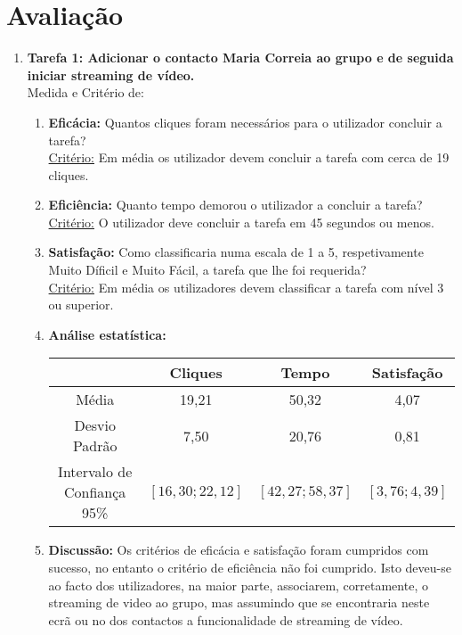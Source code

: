 \documentclass[11pt]{article}
\begin{document}
\section*{Avaliação}
    \begin{enumerate}
        \item \textbf{Tarefa 1: Adicionar o contacto Maria Correia ao grupo e de seguida iniciar streaming de vídeo.}\\
        Medida e Critério de:
        \begin{enumerate}
            \item \textbf{Eficácia:} Quantos cliques foram necessários para o utilizador concluir a tarefa?\\
            \underline{Critério:} Em média os utilizador devem concluir a tarefa com cerca de 19 cliques.
            
            \item \textbf{Eficiência:} Quanto tempo demorou o utilizador a concluir a tarefa?\\
            \underline{Critério:} O utilizador deve concluir a tarefa em 45 segundos ou menos.
            
            \item \textbf{Satisfação:} Como classificaria numa escala de 1 a 5, respetivamente Muito Díficil e Muito Fácil, a tarefa que lhe foi requerida?\\
            \underline{Critério:} Em média os utilizadores devem classificar a tarefa com nível 3 ou superior.
            
            \item \textbf{Análise estatística:} \\
            
\begin{center}
 \begin{tabular}{|c | c c c|} 
 \hline
   & Cliques & Tempo & Satisfação \\ [0.5ex] 
 \hline
 Média & 19,21 & 50,32 & 4,07 \\ 
 \hline
 Desvio Padrão & 7,50 & 20,76 & 0,81 \\
 \hline
 Intervalo de Confiança 95\% & $[16,30;22,12]$ & $[42,27;58,37]$ & $[3,76;4,39]$ \\

 \hline
\end{tabular}
\end{center}
            
            \item \textbf{Discussão:} Os critérios de eficácia e satisfação foram cumpridos com sucesso, no entanto o critério de eficiência não foi cumprido.
            Isto deveu-se ao facto dos utilizadores, na maior parte, associarem, corretamente, o streaming de video ao grupo, mas assumindo que se encontraria neste ecrã ou no dos contactos a funcionalidade de streaming de vídeo.
        \end{enumerate}
        

\end{enumerate}
\end{document}
